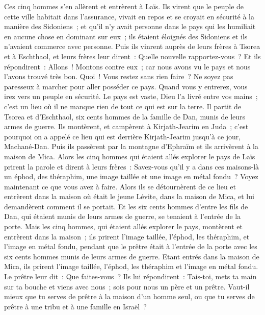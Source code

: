 \begin{multicols}{2}
Ces cinq hommes s'en allèrent et entrèrent à Laïs. Ils virent que le peuple de cette ville habitait dans l'assurance,  vivait en repos et se croyait en sécurité à la manière des Sidoniens~; et qu'il n'y avait personne dans le pays qui les humiliait en aucune chose en dominant sur eux~; ils étaient éloignés des Sidoniens et ils n'avaient commerce avec personne.
Puis ils vinrent auprès de leurs frères à Tsorea et à Eschthaol, et leurs frères leur dirent~: Quelle nouvelle rapportez-vous~?
Et ils répondirent~: Allons~! Montons contre eux~; car nous avons vu le pays et nous l'avons trouvé très bon. Quoi~! Vous restez sans rien faire~? Ne soyez pas paresseux à marcher pour aller posséder ce pays.
Quand vous y entrerez, vous irez vers un peuple en sécurité. Le pays est vaste, Dieu l'a livré entre vos mains~; c'est un lieu où il ne manque rien de tout ce qui est sur la terre.
Il partit de Tsorea et d'Eschthaol, six cents hommes de la famille de Dan, munis de leurs armes de guerre.
Ils montèrent, et campèrent à Kirjath-Jearim en Juda~; c'est pourquoi on a appelé ce lieu qui est derrière Kirjath-Jearim jusqu'à ce jour, Machané-Dan.
Puis ils passèrent par la montagne d'Ephraïm et ils arrivèrent à la maison de Mica.
Alors les cinq hommes qui étaient allés explorer le pays de Laïs prirent la parole et dirent à leurs frères~: Savez-vous qu'il y a dans ces maisons-là un éphod, des théraphim, une image taillée et une image en métal fondu~? Voyez maintenant ce que vous avez à faire.
Alors ils se détournèrent de ce lieu et entrèrent dans la maison où était le jeune Lévite, dans la maison de Mica, et lui demandèrent comment il se portait.
Et les six cents hommes d'entre les fils de Dan, qui étaient munis de leurs armes de guerre, se tenaient à l'entrée de la porte.
Mais les cinq hommes, qui étaient allés explorer le pays, montèrent et entrèrent dans la maison~; ils prirent l'image taillée, l'éphod, les théraphim, et l'image en métal fondu, pendant que le prêtre était à l'entrée de la porte avec les six cents hommes munis de leurs armes de guerre.
Etant entrés dans la maison de Mica, ils prirent l'image taillée, l'éphod, les théraphim et l'image en métal fondu. Le prêtre leur dit~: Que faites-vous~?
Ils lui répondirent~: Tais-toi, mets ta main sur ta bouche et viens avec nous~; sois pour nous un père et un prêtre. Vaut-il mieux que tu serves de prêtre à la maison d'un homme seul, ou que tu serves de prêtre à une tribu et à une famille en Israël~?

\end{multicols}
